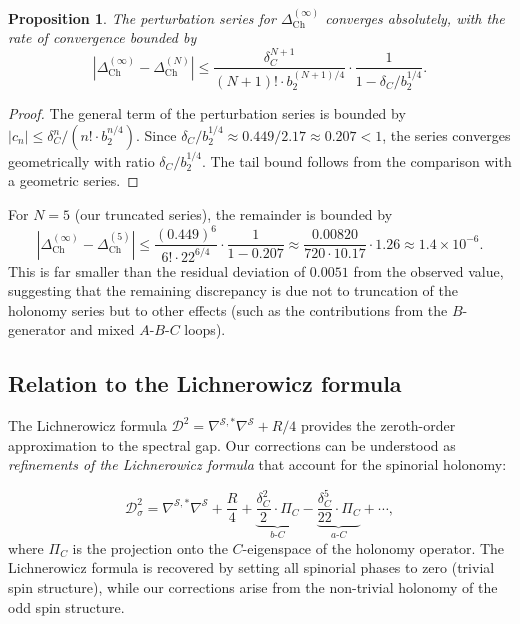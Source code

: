 \documentclass[12pt,a4paper]{article}
\newtheorem{proposition}[theorem]{Proposition}
\theoremstyle{definition}
\theoremstyle{remark}
\newcommand{\cD}{\mathcal{D}}
\newcommand{\cS}{\mathcal{S}}
\begin{document}
\begin{proposition}
\label{prop:convergence}
The perturbation series for $\Delta_{\mathrm{Ch}}^{(\infty)}$ converges absolutely, with the rate of convergence bounded by
\begin{equation}
\left|\Delta_{\mathrm{Ch}}^{(\infty)} - \Delta_{\mathrm{Ch}}^{(N)}\right| \leq \frac{\delta_C^{N+1}}{(N+1)! \cdot b_2^{(N+1)/4}} \cdot \frac{1}{1 - \delta_C / b_2^{1/4}}.
\end{equation}
\end{proposition}

\begin{proof}
The general term of the perturbation series is bounded by $|c_n| \leq \delta_C^n / (n! \cdot b_2^{n/4})$. Since $\delta_C / b_2^{1/4} \approx 0.449 / 2.17 \approx 0.207 < 1$, the series converges geometrically with ratio $\delta_C / b_2^{1/4}$. The tail bound follows from the comparison with a geometric series.
\end{proof}

For $N = 5$ (our truncated series), the remainder is bounded by
\begin{equation}
\left|\Delta_{\mathrm{Ch}}^{(\infty)} - \Delta_{\mathrm{Ch}}^{(5)}\right| \leq \frac{(0.449)^6}{6! \cdot 22^{6/4}} \cdot \frac{1}{1 - 0.207} \approx \frac{0.00820}{720 \cdot 10.17} \cdot 1.26 \approx 1.4 \times 10^{-6}.
\end{equation}
This is far smaller than the residual deviation of $0.0051$ from the observed value, suggesting that the remaining discrepancy is due not to truncation of the holonomy series but to other effects (such as the contributions from the $B$-generator and mixed $A$-$B$-$C$ loops).

\subsection{Relation to the Lichnerowicz formula}

The Lichnerowicz formula $\cD^2 = \nabla^{\cS,*}\nabla^{\cS} + R/4$ provides the zeroth-order approximation to the spectral gap. Our corrections can be understood as \emph{refinements of the Lichnerowicz formula} that account for the spinorial holonomy:

\begin{equation}
\cD^2_{\sigma} = \nabla^{\cS,*}\nabla^{\cS} + \frac{R}{4} + \underbrace{\frac{\delta_C^2}{2} \cdot \Pi_C}_{b\text{-}C} - \underbrace{\frac{\delta_C^5}{22} \cdot \Pi_C}_{a\text{-}C} + \cdots,
\end{equation}
where $\Pi_C$ is the projection onto the $C$-eigenspace of the holonomy operator. The Lichnerowicz formula is recovered by setting all spinorial phases to zero (trivial spin structure), while our corrections arise from the non-trivial holonomy of the odd spin structure.
\end{document}

